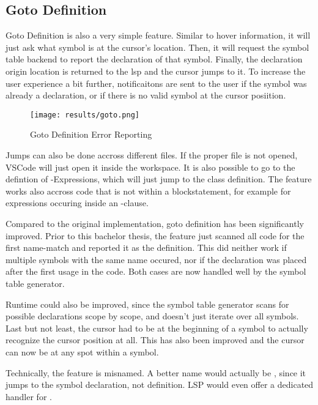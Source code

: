 \subsection{Goto Definition}
Goto Definition is also a very simple feature.
Similar to hover information, it will just ask what symbol is at the cursor's location.
Then, it will request the symbol table backend to report the declaration of that symbol.
Finally, the declaration origin location is returned to the lsp and the cursor jumps to it.
To increase the user experience a bit further, notificaitons are sent to the user if the symbol was already a declaration, or if there is no valid symbol at the cursor posiition.
\begin{figure}[h]
    \centering
    \texttt{[image: results/goto.png]}
    \caption{Goto Definition Error Reporting}
    \label{fig:goto}
\end{figure}


Jumps can also be done accross different files.
If the proper file is not opened, VSCode will just open it inside the workspace.
It is also possible to go to the defintion of -Expressions, which will just jump to the class definition.
The feature works also accross code that is not within a blockstatement, for example for expressions occuring inside an -clause.

Compared to the original implementation, goto definition has been significantly improved.
Prior to this bachelor thesis, the feature just scanned all code for the first name-match and reported it as the definition.
This did neither work if multiple symbols with the same name occured, nor if the declaration was placed after the first usage in the code.
Both cases are now handled well by the symbol table generator.

Runtime could also be improved, since the symbol table generator scans for possible declarations scope by scope, and doesn't just iterate over all symbols.
Last but not least, the cursor had to be at the beginning of a symbol to actually recognize the cursor position at all.
This has also been improved and the cursor can now be at any spot within a symbol.

Technically, the feature is misnamed.
A better name would actually be , since it jumps to the symbol declaration, not definition.
LSP would even offer a dedicated handler for  \cite{lspspec}.

